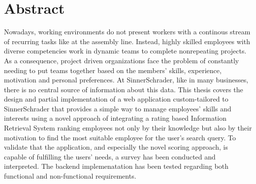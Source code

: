 \chapter{Abstract}
Nowadays, working environments do not present workers with a continous stream of recurring tasks like at the assembly line. Instead, highly skilled employees with diverse competencies work in dynamic teams to complete nonrepeating projects.
As a consequence, project driven organizations face the problem of constantly needing to put teams together based on the members’ skills, experience, motivation and personal preferences. At SinnerSchrader, like in many businesses, there is no central source of information about this data.
This thesis covers the design and partial implementation of a web application custom-tailored to SinnerSchrader that provides a simple way to manage employees' skills and interests using a novel approach of integrating a rating based Information Retrieval System ranking employees not only by their knowledge but also by their motivation to find the most suitable employee for the user's search query.
To validate that the application, and especially the novel scoring approach, is capable of fulfilling the users’ needs, a survey has been conducted and interpreted. The backend implemenatation has been tested regarding both functional and non-functional requirements.
